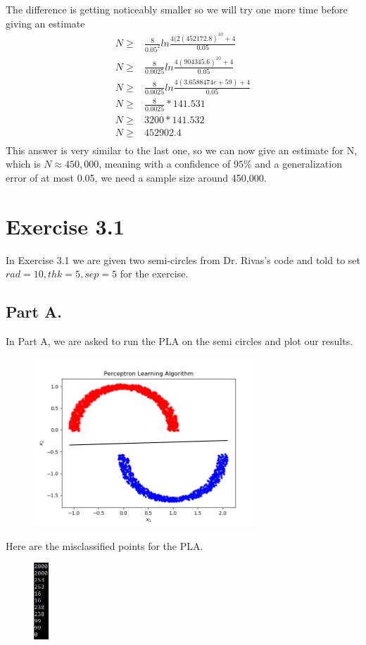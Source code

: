 \documentclass[a4paper]{article}
\begin{document}
The difference is getting noticeably smaller so we will try one more time before giving an estimate
\begin{align}
    N \geq & \frac{8}{0.05^2}ln\frac{4(2(452172.8)^{10} + 4}{0.05}\\
    N \geq & \frac{8}{0.0025}ln\frac{4(904345.6)^{10} + 4}{0.05}\\
    N \geq & \frac{8}{0.0025}ln\frac{4(3.6588474e+59) + 4}{0.05}\\
    N \geq & \frac{8}{0.0025} * 141.531\\
    N \geq & 3200 * 141.532\\
    N \geq & 452902.4\\
\end{align}
This answer is very similar to the last one, so we can now give an estimate for N, which is $N \approx 450,000$, meaning with a confidence of $95\%$ and a generalization error of at most 0.05, we need a sample size around 450,000. 
\section{Exercise 3.1}
In Exercise 3.1 we are given two semi-circles from Dr. Rivas's code and told to set $rad = 10, thk = 5, sep = 5$ for the exercise.
\subsection{Part A.}
In Part A, we are asked to run the PLA on the semi circles and plot our results. 
\begin{figure}[H]
    \begin{center}
        \includegraphics[width=0.75\textwidth]{hw02pla.png}
    \end{center}
    \label{fig:partapla}
\end{figure}
Here are the misclassified points for the PLA.
\begin{figure}[H]
    \begin{center}
        \includegraphics[width=0.05\textwidth]{hw02pladata.PNG}
    \end{center}
    \label{fig:partapladata}
\end{figure}
\end{document}
